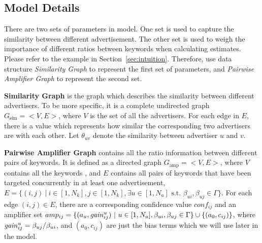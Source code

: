 \subsection{Model Details}
\label{sec:details}


There are two sets of parameters in {\sppan} model. One set is used to
capture the similarity between different advertisement. The other set
is used to weigh the importance of different ratios between keywords
when calculating estimates. Please refer to the example in
Section~\ref{sec:intuition}. Therefore, use data structure {\it
  Similarity Graph} to represent the first set of parameters, and {\it
  Pairwise Amplifier Graph} to represent the second set.

{\bf Similarity Graph} is the graph which describes the similarity
between different advertisers. To be more specific, it is a complete
undirected graph $G_{\mbox{sim}}=<V,E>$, where $V$ is the set of all
the advertisers. For each edge in $E$, there is a value which
represents how similar the corresponding two advertisers are with each
other. Let $\theta_{uv}$ denote the similarity between advertiser
$u$ and $v$.


{\bf Pairwise Amplifier Graph} contains all the ratio information
between different pairs of keywords. It is defined as a directed graph
$G_{\mbox{amp}}=<V,E>$, where $V$ contains all the keywords , and $E$
contains all pairs of keywords that have been targeted concurrently in
at least one advertisement, $E=\{(i,j)~|~ i\in [1,N_k],j \in
[1,N_k],\exists u\in [1,N_a]\mbox{ s.t. }\beta_{ui},\beta_{uj}\in
\Gamma\}$. For each edge $(i,j)\in E$, there are a corresponding
confidence value $conf_{ij}$ and an amplifier set
$amp_{ij}=\{(a_u,\mathit{gain}^{u}_{ij})~|~u\in [1,N_a],\beta_{ui},\beta_{uj}\in
\Gamma\} \cup \{(a_0,c_{ij})\}$, where
$\mathit{gain}^{u}_{ij}=\beta_{uj}/\beta_{ui}$, and $(a_0,c_{ij})$ are just the
bias terms which we will use later in the model.

